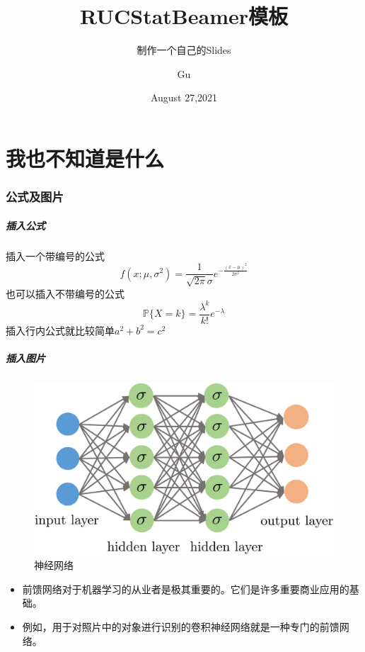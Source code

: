 \documentclass[aspectratio=169]{mybeamer}
\title{RUCStatBeamer模板}
\subtitle{制作一个自己的Slides}
\author{Gu}
\date[Aug. 27,2021]{August 27,2021}
\begin{document}
	\frame{\titlepage}
	\addPartPage

	\part{我也不知道是什么}

	\addSectionPage

	\section{公式及图片}
	\begin{frame}
		\frametitle{插入公式}
		插入一个带编号的公式
		\begin{equation}
			f(x;\mu,\sigma^2) = \frac{1}{\sqrt{2 \pi} \sigma } e^{-\frac{(x - \mu)^2}{2 \sigma^2}}
		\end{equation}
		也可以插入不带编号的公式
		\begin{equation*}
			\mathbb{P}\{ X = k\} = \frac{\lambda^k}{k!} e^{-\lambda} 
		\end{equation*}
		插入行内公式就比较简单$a^2 + b^2 = c^2$
	\end{frame}

	\begin{frame}
		\frametitle{插入图片}
		\begin{minipage}[c]{.5\textwidth}
			\begin{figure}[htb]
				\centering
				\includegraphics[width=\textwidth]{figures/nn.jpg}
				\caption{神经网络}
			\end{figure}
		\end{minipage}
		\hspace{0.1cm}
		\begin{minipage}[c]{.45\textwidth}
			\begin{itemize}
				\setlength{\itemsep}{1cm}
				\item 前馈网络对于机器学习的从业者是极其重要的。它们是许多重要商业应用的基
				础。
				\item 例如，用于对照片中的对象进行识别的卷积神经网络就是一种专门的前馈网络。
			\end{itemize}
		\end{minipage}
	\end{frame}
\end{document}
